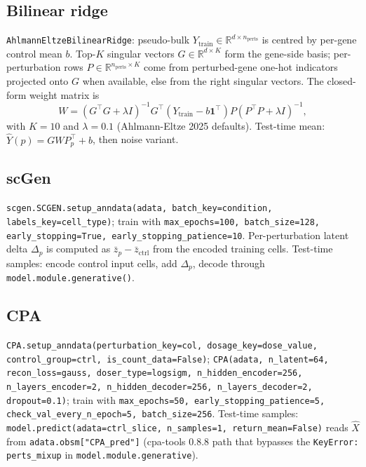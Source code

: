 \documentclass{article}
\begin{document}
\subsection{Bilinear ridge \citep{ahlmann2025}}
\texttt{AhlmannEltzeBilinearRidge}: pseudo-bulk $Y_{\text{train}} \in \mathbb{R}^{d \times n_{\text{perts}}}$ is centred by per-gene control mean $b$. Top-$K$ singular vectors $G \in \mathbb{R}^{d \times K}$ form the gene-side basis; per-perturbation rows $P \in \mathbb{R}^{n_{\text{perts}} \times K}$ come from perturbed-gene one-hot indicators projected onto $G$ when available, else from the right singular vectors. The closed-form weight matrix is
\begin{equation}
W = (G^\top G + \lambda I)^{-1} G^\top (Y_{\text{train}} - b\mathbf{1}^\top) P (P^\top P + \lambda I)^{-1},
\end{equation}
with $K = 10$ and $\lambda = 0.1$ (Ahlmann-Eltze 2025 defaults). Test-time mean: $\hat{Y}(p) = G W P_p^\top + b$, then noise variant.

\subsection{scGen \citep{lotfollahi2019scgen}}
\texttt{scgen.SCGEN.setup\_anndata(adata, batch\_key=condition, labels\_key=cell\_type)}; train with \texttt{max\_epochs=100, batch\_size=128, early\_stopping=True, early\_stopping\_patience=10}. Per-perturbation latent delta $\Delta_p$ is computed as $\bar{z}_p - \bar{z}_{\text{ctrl}}$ from the encoded training cells. Test-time samples: encode control input cells, add $\Delta_p$, decode through \texttt{model.module.generative()}.

\subsection{CPA \citep{lotfollahi2023cpa}}
\texttt{CPA.setup\_anndata(perturbation\_key=col, dosage\_key=dose\_value, control\_group=ctrl, is\_count\_data=False)}; \texttt{CPA(adata, n\_latent=64, recon\_loss=gauss, doser\_type=logsigm, n\_hidden\_encoder=256, n\_layers\_encoder=2, n\_hidden\_decoder=256, n\_layers\_decoder=2, dropout=0.1)}; train with \texttt{max\_epochs=50, early\_stopping\_patience=5, check\_val\_every\_n\_epoch=5, batch\_size=256}. Test-time samples: \texttt{model.predict(adata=ctrl\_slice, n\_samples=1, return\_mean=False)} reads $\hat{X}$ from \texttt{adata.obsm["CPA\_pred"]} (cpa-tools 0.8.8 path that bypasses the \texttt{KeyError: perts\_mixup} in \texttt{model.module.generative}).
\end{document}
